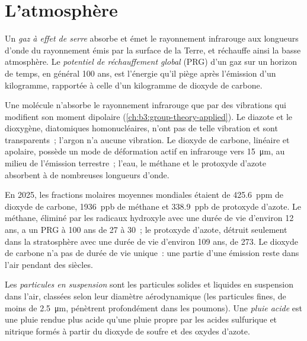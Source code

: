 \section{L'atmosphère}

\begin{definition}\label{def:b3:environmental-toxicology:greenhouse}
Un \emph{gaz à effet de serre} absorbe et émet le
rayonnement infrarouge aux longueurs d'onde du rayonnement émis par la
surface de la Terre, et réchauffe ainsi la basse atmosphère. Le
\emph{potentiel de réchauffement global} (PRG) d'un gaz sur un
horizon de temps, en général 100 ans, est l'énergie qu'il piège après
l'émission d'un kilogramme, rapportée à celle d'un kilogramme de dioxyde
de carbone.
\end{definition}

Une molécule n'absorbe le rayonnement infrarouge que par des vibrations
qui modifient son moment dipolaire (\cref{ch:b3:group-theory-applied}). Le
diazote et le dioxygène, diatomiques homonucléaires, n'ont pas de telle
vibration et sont transparents~; l'argon n'a aucune vibration. Le dioxyde
de carbone, linéaire et apolaire, possède un mode de déformation actif en
infrarouge vers \qty{15}{\micro\metre}, au milieu de l'émission terrestre~; l'eau, le méthane
et le protoxyde d'azote absorbent à de nombreuses longueurs d'onde.

En 2025, les fractions molaires moyennes mondiales étaient de \qty{425.6}{ppm} de dioxyde de carbone, \qty{1936}{ppb} de
méthane et \qty{338.9}{ppb} de protoxyde d'azote. Le méthane, éliminé par les radicaux hydroxyle avec une
durée de vie d'environ 12 ans, a un PRG à 100 ans de 27 à 30~; le protoxyde d'azote, détruit seulement dans
la stratosphère avec une durée de vie d'environ 109 ans, de 273. Le dioxyde
de carbone n'a pas de durée de vie unique~: une partie d'une émission reste
dans l'air pendant des siècles.

\begin{definition}\label{def:b3:environmental-toxicology:pollutants}
Les \emph{particules en suspension} sont les particules
solides et liquides en suspension dans l'air, classées selon leur diamètre
aérodynamique (les particules fines, de moins de \qty{2.5}{\micro\metre}, pénètrent profondément dans les poumons). Une \emph{pluie acide} est une pluie
rendue plus acide qu'une pluie propre par les acides sulfurique et
nitrique formés à partir du dioxyde de soufre et des oxydes d'azote.
\end{definition}

